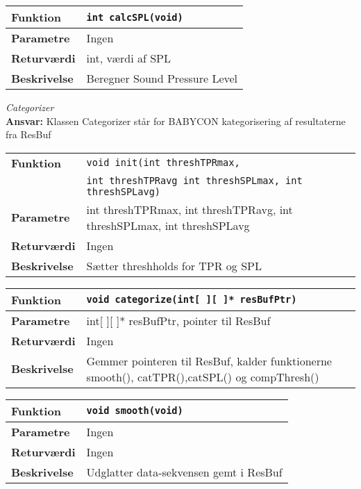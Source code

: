 \begin{center}
    \begin{tabular}{ | l | p{} |}
    \hline
    \textbf{Funktion}	& \verb+int calcSPL(void) +						\\ \hline
    \textbf{Parametre} 	& Ingen		\\ \hline
    \textbf{Returværdi}	& int, værdi af SPL 								\\ \hline
    \textbf{Beskrivelse}& Beregner Sound Pressure Level		\\ \hline
    \end{tabular}
\end{center} 


\textit{Categorizer} \\
\textbf{Ansvar:} Klassen Categorizer står for BABYCON kategorisering af resultaterne fra ResBuf

\begin{center}
    \begin{tabular}{ | l | p{} |}
    \hline
    \textbf{Funktion}	& \verb+void init(int threshTPRmax,+ \\ &
    						 \verb+int threshTPRavg int threshSPLmax, int threshSPLavg) +						\\ \hline
    \textbf{Parametre} 	& int threshTPRmax, int threshTPRavg, int threshSPLmax, int threshSPLavg		\\ \hline
    \textbf{Returværdi}	& Ingen	 								\\ \hline
    \textbf{Beskrivelse}& Sætter threshholds for TPR og SPL		\\ \hline
    \end{tabular}
\end{center}

\begin{center}
    \begin{tabular}{ | l | p{} |}
    \hline
    \textbf{Funktion}	& \verb+void categorize(int[ ][ ]* resBufPtr) +						\\ \hline
    \textbf{Parametre} 	& int[ ][ ]* resBufPtr, pointer til ResBuf		\\ \hline
    \textbf{Returværdi}	& Ingen	 								\\ \hline
    \textbf{Beskrivelse}& Gemmer pointeren til ResBuf, kalder funktionerne smooth(), catTPR(),catSPL() og compThresh()		\\ \hline
    \end{tabular}
\end{center}

\begin{center}
    \begin{tabular}{ | l | p{} |}
    \hline
    \textbf{Funktion}	& \verb+void smooth(void) +						\\ \hline
    \textbf{Parametre} 	& Ingen		\\ \hline
    \textbf{Returværdi}	& Ingen	 								\\ \hline
    \textbf{Beskrivelse}& Udglatter data-sekvensen gemt i ResBuf		\\ \hline
    \end{tabular}
\end{center}

